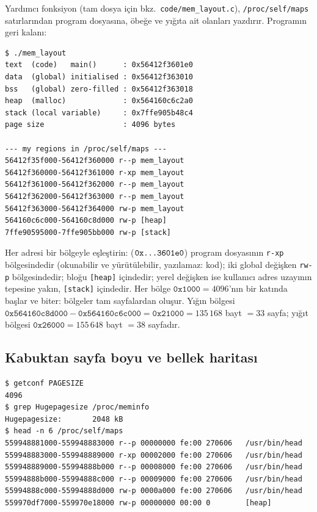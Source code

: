 Yardımcı fonksiyon  (tam dosya için bkz.\ \texttt{code/mem\_layout.c}), \texttt{/proc/self/maps} satırlarından program dosyasına, öbeğe ve yığıta ait olanları yazdırır. Programın geri kalanı:


\vspace{-0.6em}


\begin{lstlisting}[style=term]
$ ./mem_layout
text  (code)   main()      : 0x56412f3601e0
data  (global) initialised : 0x56412f363010
bss   (global) zero-filled : 0x56412f363018
heap  (malloc)             : 0x564160c6c2a0
stack (local variable)     : 0x7ffe905b48c4
page size                  : 4096 bytes

--- my regions in /proc/self/maps ---
56412f35f000-56412f360000 r--p mem_layout
56412f360000-56412f361000 r-xp mem_layout
56412f361000-56412f362000 r--p mem_layout
56412f362000-56412f363000 r--p mem_layout
56412f363000-56412f364000 rw-p mem_layout
564160c6c000-564160c8d000 rw-p [heap]
7ffe90595000-7ffe905bb000 rw-p [stack]
\end{lstlisting}

Her adresi bir bölgeyle eşleştirin:  ($\texttt{0x\dots3601e0}$) program dosyasının \texttt{r-xp} bölgesindedir (okunabilir ve yürütülebilir, yazılamaz: kod); iki global değişken \texttt{rw-p} bölgesindedir;  bloğu \texttt{[heap]} içindedir; yerel değişken ise kullanıcı adres uzayının tepesine yakın, \texttt{[stack]} içindedir. Her bölge $\texttt{0x1000} = 4096$'nın bir katında başlar ve biter: bölgeler tam sayfalardan oluşur. Yığın bölgesi $\texttt{0x564160c8d000} - \texttt{0x564160c6c000} = \texttt{0x21000} = 135\,168$ bayt $= 33$ sayfa; yığıt bölgesi $\texttt{0x26000} = 155\,648$ bayt $= 38$ sayfadır.

\subsection{Kabuktan sayfa boyu ve bellek haritası}

\begin{lstlisting}[style=term]
$ getconf PAGESIZE
4096
$ grep Hugepagesize /proc/meminfo
Hugepagesize:       2048 kB
$ head -n 6 /proc/self/maps
559948881000-559948883000 r--p 00000000 fe:00 270606   /usr/bin/head
559948883000-559948889000 r-xp 00002000 fe:00 270606   /usr/bin/head
559948889000-55994888b000 r--p 00008000 fe:00 270606   /usr/bin/head
55994888b000-55994888c000 r--p 00009000 fe:00 270606   /usr/bin/head
55994888c000-55994888d000 rw-p 0000a000 fe:00 270606   /usr/bin/head
559970df7000-559970e18000 rw-p 00000000 00:00 0        [heap]
\end{lstlisting}

